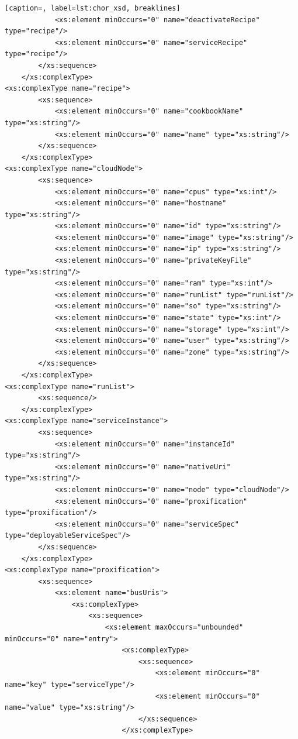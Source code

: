 {\begin{lstlisting}[caption=, label=lst:chor_xsd, breaklines]
            <xs:element minOccurs="0" name="deactivateRecipe" type="recipe"/>
            <xs:element minOccurs="0" name="serviceRecipe" type="recipe"/>
        </xs:sequence>
    </xs:complexType>
<xs:complexType name="recipe">
        <xs:sequence>
            <xs:element minOccurs="0" name="cookbookName" type="xs:string"/>
            <xs:element minOccurs="0" name="name" type="xs:string"/>
        </xs:sequence>
    </xs:complexType>
<xs:complexType name="cloudNode">
        <xs:sequence>
            <xs:element minOccurs="0" name="cpus" type="xs:int"/>
            <xs:element minOccurs="0" name="hostname" type="xs:string"/>
            <xs:element minOccurs="0" name="id" type="xs:string"/>
            <xs:element minOccurs="0" name="image" type="xs:string"/>
            <xs:element minOccurs="0" name="ip" type="xs:string"/>
            <xs:element minOccurs="0" name="privateKeyFile" type="xs:string"/>
            <xs:element minOccurs="0" name="ram" type="xs:int"/>
            <xs:element minOccurs="0" name="runList" type="runList"/>
            <xs:element minOccurs="0" name="so" type="xs:string"/>
            <xs:element minOccurs="0" name="state" type="xs:int"/>
            <xs:element minOccurs="0" name="storage" type="xs:int"/>
            <xs:element minOccurs="0" name="user" type="xs:string"/>
            <xs:element minOccurs="0" name="zone" type="xs:string"/>
        </xs:sequence>
    </xs:complexType>
<xs:complexType name="runList">
        <xs:sequence/>
    </xs:complexType>
<xs:complexType name="serviceInstance">
        <xs:sequence>
            <xs:element minOccurs="0" name="instanceId" type="xs:string"/>
            <xs:element minOccurs="0" name="nativeUri" type="xs:string"/>
            <xs:element minOccurs="0" name="node" type="cloudNode"/>
            <xs:element minOccurs="0" name="proxification" type="proxification"/>
            <xs:element minOccurs="0" name="serviceSpec" type="deployableServiceSpec"/>
        </xs:sequence>
    </xs:complexType>
<xs:complexType name="proxification">
        <xs:sequence>
            <xs:element name="busUris">
                <xs:complexType>
                    <xs:sequence>
                        <xs:element maxOccurs="unbounded" minOccurs="0" name="entry">
                            <xs:complexType>
                                <xs:sequence>
                                    <xs:element minOccurs="0" name="key" type="serviceType"/>
                                    <xs:element minOccurs="0" name="value" type="xs:string"/>
                                </xs:sequence>
                            </xs:complexType>

\end{lstlisting}}

